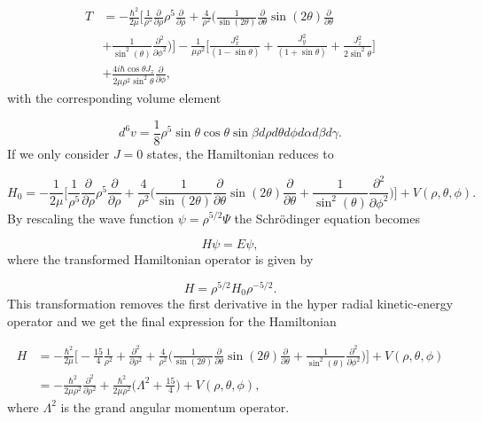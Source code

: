 \begin{equation}
\begin{aligned}
T &=-\frac{\hbar^2}{2\mu}\Bigg[\frac{1}{\rho^5}\frac{\partial}{\partial\rho}\rho^5\frac{\partial}{\partial\rho} + \frac{4}{\rho^2}\Bigg(\frac{1}{\sin(2\theta)}\frac{\partial}{\partial\theta}\sin(2\theta)\frac{\partial}{\partial\theta}\\
&+\frac{1}{\sin^2(\theta)}\frac{\partial^2}{\partial\phi^2} \Bigg)\Bigg]-\frac{1}{\mu\rho^2}\Bigg[\frac{J^2_x}{(1-\sin\theta)} + \frac{J^2_y}{(1+\sin\theta)} +\frac{J^2_z}{2\sin^2\theta}\Bigg]\\
&+ \frac{4i\hbar\cos\theta J_z}{2\mu\rho^2\sin^2\theta}\frac{\partial}{\partial\phi},
\end{aligned}
\end{equation}
with the corresponding volume element

\begin{equation}
d^6 v = \frac{1}{8}\rho^5 \sin\theta\cos\theta\sin\beta d\rho d\theta d\phi d\alpha d\beta d\gamma.
\end{equation}
If we only consider $J=0$ states, the Hamiltonian reduces to 

\begin{equation}
H_{0} = -\frac{1}{2 \mu} \Bigg[ \frac{1}{\rho^{5}} \frac{\partial}{\partial \rho} \rho^{5} \frac{\partial}{\partial \rho} + \frac{4}{\rho^{2}}\Big( \frac{1}{\sin(2\theta)} \frac{\partial}{\partial \theta} \sin(2\theta) \frac{\partial}{\partial \theta} + \frac{1}{\sin^{2}(\theta)} \frac{\partial^{2}}{\partial \phi^{2}} \Big) \Bigg] + V(\rho, \theta, \phi).
\end{equation}
By rescaling the wave function $\psi = \rho^{5/2} \Psi$ the Schr{\"o}dinger equation becomes

\begin{equation}
H \psi = E \psi,
\end{equation}
where the transformed Hamiltonian operator is given by

\begin{equation}
H = \rho^{5/2}H_{0} \rho^{-5/2}. 
\end{equation}
This transformation removes the first derivative in the hyper radial kinetic-energy operator and we get the final expression for the Hamiltonian

\begin{align}
H &= -\frac{\hbar^{2}}{2 \mu} \Bigg[ -\frac{15}{4} \frac{1}{\rho^{2}} + \frac{\partial^{2}}{\partial \rho^{2}}+ \frac{4}{\rho^{2}}\Big( \frac{1}{\sin(2\theta)} \frac{\partial}{\partial \theta} \sin(2\theta) \frac{\partial}{\partial \theta} + \frac{1}{\sin^{2}(\theta)} \frac{\partial^{2}}{\partial \phi^{2}} \Big) \Bigg] + V(\rho, \theta, \phi)\\
&= -\frac{\hbar^{2}}{2 \mu \rho^{2} }\frac{\partial^2}{\partial \rho^2} + \frac{\hbar^{2}}{2 \mu \rho^{2} } \Bigg(\Lambda^2 + \frac{15}{4}\Bigg)+ V(\rho, \theta, \phi),
\end{align}
where $\Lambda^2$ is the grand angular momentum operator.

